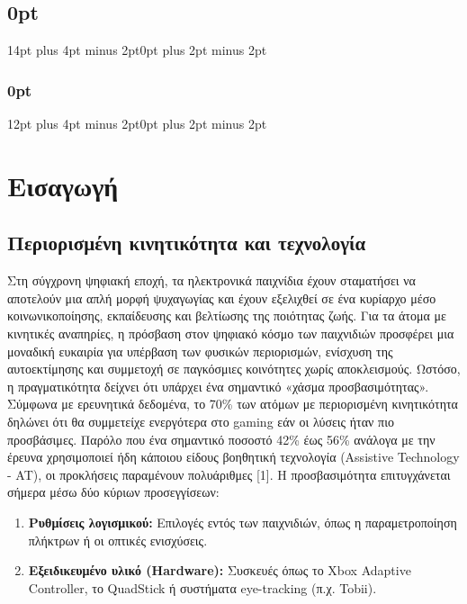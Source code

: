 \documentclass[twoside, a4paper, 11pt]{article}
\begin{document}
\clearpage
{}

\normalsize 
\pagestyle{custom_page_style} 

\titlespacing\subsection{0pt}{14pt plus 4pt minus 2pt}{0pt plus 2pt minus 2pt}
\titlespacing\subsubsection{0pt}{12pt plus 4pt minus 2pt}{0pt plus 2pt minus 2pt}

\setlength{\parskip}{1em}

\section{Εισαγωγή}

\subsection{Περιορισμένη κινητικότητα και τεχνολογία}
Στη σύγχρονη ψηφιακή εποχή, τα ηλεκτρονικά παιχνίδια έχουν σταματήσει να αποτελούν μια απλή
μορφή ψυχαγωγίας και έχουν εξελιχθεί σε ένα κυρίαρχο μέσο κοινωνικοποίησης, εκπαίδευσης και βελτίωσης της ποιότητας ζωής. Για τα άτομα με κινητικές αναπηρίες, η πρόσβαση στον ψηφιακό κόσμο
των παιχνιδιών προσφέρει μια μοναδική ευκαιρία για υπέρβαση των φυσικών περιορισμών, ενίσχυση
της αυτοεκτίμησης και συμμετοχή σε παγκόσμιες κοινότητες χωρίς αποκλεισμούς.
Ωστόσο, η πραγματικότητα δείχνει ότι υπάρχει ένα σημαντικό «χάσμα προσβασιμότητας». Σύμφωνα με
ερευνητικά δεδομένα, το 70\% των ατόμων με περιορισμένη κινητικότητα δηλώνει ότι θα συμμετείχε
ενεργότερα στο gaming εάν οι λύσεις ήταν πιο προσβάσιμες. Παρόλο που ένα σημαντικό ποσοστό 42\% έως 56\% ανάλογα με την έρευνα χρησιμοποιεί ήδη κάποιου είδους βοηθητική τεχνολογία
(Assistive Technology - AT), οι προκλήσεις παραμένουν πολυάριθμες [1].
Η προσβασιμότητα επιτυγχάνεται σήμερα μέσω δύο κύριων προσεγγίσεων:
\begin{enumerate}
    \item \textbf{Ρυθμίσεις λογισμικού:} Επιλογές εντός των παιχνιδιών, όπως η παραμετροποίηση πλήκτρων ή οι οπτικές ενισχύσεις.
    \item \textbf{Εξειδικευμένο υλικό (Hardware):} Συσκευές όπως το Xbox Adaptive Controller, το QuadStick ή συστήματα eye-tracking (π.χ. Tobii).
\end{enumerate}
\end{document}
